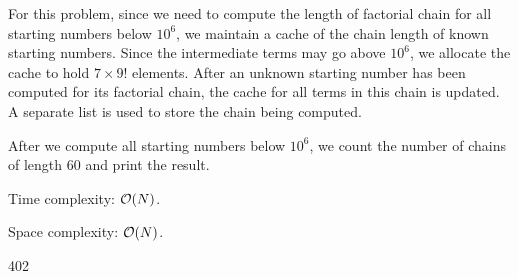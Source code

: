 For this problem, since we need to compute the length of factorial chain for all starting numbers below $10^6$, we maintain a cache of the chain length of known starting numbers. Since the intermediate terms may go above $10^6$, we allocate the cache to hold $7 \times 9!$ elements. After an unknown starting number has been computed for its factorial chain, the cache for all terms in this chain is updated. A separate list is used to store the chain being computed. 

After we compute all starting numbers below $10^6$, we count the number of chains of length 60 and print the result.

\complexity

Time complexity: $\mathcal{O}(N)$.

Space complexity: $\mathcal{O}(N)$.

\answer

402

 